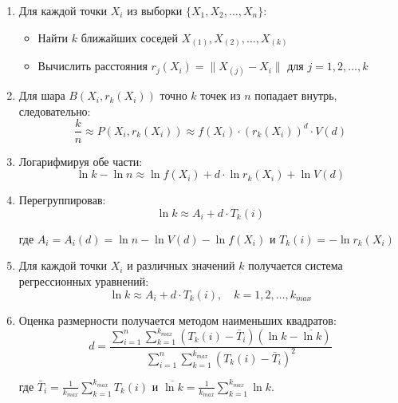 \documentclass[a4paper,12pt]{article}
\begin{document}
\begin{enumerate}
    \item Для каждой точки $X_i$ из выборки $\{X_1, X_2, \ldots, X_n\}$:
    \begin{itemize}
        \item Найти $k$ ближайших соседей $X_{(1)}, X_{(2)}, \ldots, X_{(k)}$
        \item Вычислить расстояния $r_j(X_i) = \|X_{(j)} - X_i\|$ для $j = 1, 2, \ldots, k$
    \end{itemize}

    \item Для шара $B(X_i, r_k(X_i))$ точно $k$ точек из $n$ попадает внутрь, следовательно:
    \begin{equation}
        \frac{k}{n} \approx P(X_i, r_k(X_i)) \approx f(X_i) \cdot (r_k(X_i))^d \cdot V(d)
    \end{equation}

    \item Логарифмируя обе части:
    \begin{equation}
        \ln k - \ln n \approx \ln f(X_i) + d \cdot \ln r_k(X_i) + \ln V(d)
    \end{equation}

    \item Перегруппировав:
    \begin{equation}
        \ln k \approx A_i + d \cdot T_k(i)
    \end{equation}
    
    где $A_i = A_i(d) = \ln n - \ln V(d) - \ln f(X_i)$ и $T_k(i) = -\ln r_k(X_i)$

    \item Для каждой точки $X_i$ и различных значений $k$ получается система регрессионных уравнений:
    \begin{equation}
        \ln k \approx A_i + d \cdot T_k(i), \quad k = 1, 2, \ldots, k_{max}
    \end{equation}

    \item Оценка размерности получается методом наименьших квадратов:
    \begin{equation}
        d = \frac{\sum_{i=1}^n \sum_{k=1}^{k_{max}} (T_k(i) - \bar{T}_i)(\ln k - \overline{\ln k})}{\sum_{i=1}^n \sum_{k=1}^{k_{max}} (T_k(i) - \bar{T}_i)^2}
    \end{equation}

    где $\bar{T}_i = \frac{1}{k_{max}} \sum_{k=1}^{k_{max}} T_k(i)$ и $\overline{\ln k} = \frac{1}{k_{max}} \sum_{k=1}^{k_{max}} \ln k$.
\end{enumerate}
\end{document}

